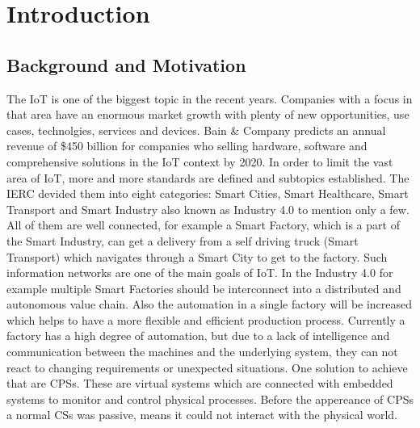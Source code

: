 \chapter{Introduction}

\section{Background and Motivation}

The \ac{IoT} is one of the biggest topic in the recent years.
Companies with a focus in that area have an enormous market growth with plenty of new opportunities, use cases, technolgies, services and devices.
Bain \& Company predicts an annual revenue of \$450 billion for companies who selling hardware, software and comprehensive solutions in the \ac{IoT} context by 2020.\cite{Bosche:2016}
In order to limit the vast area of \ac{IoT}, more and more standards are defined and subtopics established.
The \ac{IERC} devided them into eight categories: Smart Cities, Smart Healthcare, Smart Transport and Smart Industry also known as Industry 4.0 to mention only a few.
All of them are well connected, for example a Smart Factory, which is a part of the Smart Industry, can get a delivery from a self driving truck (Smart Transport) which navigates through a Smart City to get to the factory.
Such information networks are one of the main goals of \ac{IoT}.
In the Industry 4.0 for example multiple Smart Factories should be interconnect into a distributed and autonomous value chain.
Also the automation in a single factory will be increased which helps to have a more flexible and efficient production process.
Currently a factory has a high degree of automation, but due to a lack of intelligence and communication between the machines and the underlying system, they can not react to changing requirements or unexpected situations.
One solution to achieve that are \acp{CPS}.
These are virtual systems which are connected with embedded systems to monitor and control physical processes.\cite{Lee:2008}
Before the appereance of \acp{CPS} a normal \acp{CS} was passive, means it could not interact with the physical world.\cite{Poovendran:2010}

